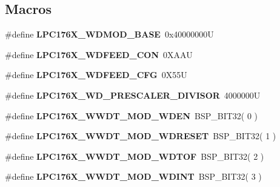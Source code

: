 \subsection*{Macros}
\begin{DoxyCompactItemize}
\item 
\mbox{\label{watchdog-defs_8h_a9f98bcea1ca4829aee008e99ff6b1136}} 
\#define {\bfseries L\+P\+C176\+X\+\_\+\+W\+D\+M\+O\+D\+\_\+\+B\+A\+SE}~0x40000000U
\item 
\mbox{\label{watchdog-defs_8h_a04e0ec53d2161706e6ab1827c989cc6e}} 
\#define {\bfseries L\+P\+C176\+X\+\_\+\+W\+D\+F\+E\+E\+D\+\_\+\+C\+ON}~0\+X\+A\+AU
\item 
\mbox{\label{watchdog-defs_8h_ac76c503443bbfca53f1d02da9f82660c}} 
\#define {\bfseries L\+P\+C176\+X\+\_\+\+W\+D\+F\+E\+E\+D\+\_\+\+C\+FG}~0\+X55U
\item 
\mbox{\label{watchdog-defs_8h_a920ddaa6065d1864069e18df753b2ef5}} 
\#define {\bfseries L\+P\+C176\+X\+\_\+\+W\+D\+\_\+\+P\+R\+E\+S\+C\+A\+L\+E\+R\+\_\+\+D\+I\+V\+I\+S\+OR}~4000000U
\item 
\mbox{\label{watchdog-defs_8h_a42fe14603f26c7fa419f4c929ebea7ac}} 
\#define {\bfseries L\+P\+C176\+X\+\_\+\+W\+W\+D\+T\+\_\+\+M\+O\+D\+\_\+\+W\+D\+EN}~B\+S\+P\+\_\+\+B\+I\+T32( 0 )
\item 
\mbox{\label{watchdog-defs_8h_a5e75c064a16ee23501ad380edba164ad}} 
\#define {\bfseries L\+P\+C176\+X\+\_\+\+W\+W\+D\+T\+\_\+\+M\+O\+D\+\_\+\+W\+D\+R\+E\+S\+ET}~B\+S\+P\+\_\+\+B\+I\+T32( 1 )
\item 
\mbox{\label{watchdog-defs_8h_a4481818cd7cc55e7f503f81b3c982e49}} 
\#define {\bfseries L\+P\+C176\+X\+\_\+\+W\+W\+D\+T\+\_\+\+M\+O\+D\+\_\+\+W\+D\+T\+OF}~B\+S\+P\+\_\+\+B\+I\+T32( 2 )
\item 
\mbox{\label{watchdog-defs_8h_ad7c4a5cf190e37c7c37747a29755adec}} 
\#define {\bfseries L\+P\+C176\+X\+\_\+\+W\+W\+D\+T\+\_\+\+M\+O\+D\+\_\+\+W\+D\+I\+NT}~B\+S\+P\+\_\+\+B\+I\+T32( 3 )
\item 
\mbox{\label{watchdog-defs_8h_affc56d1f21b6bcf7804e245230a77762}} 

\end{DoxyCompactItemize}
